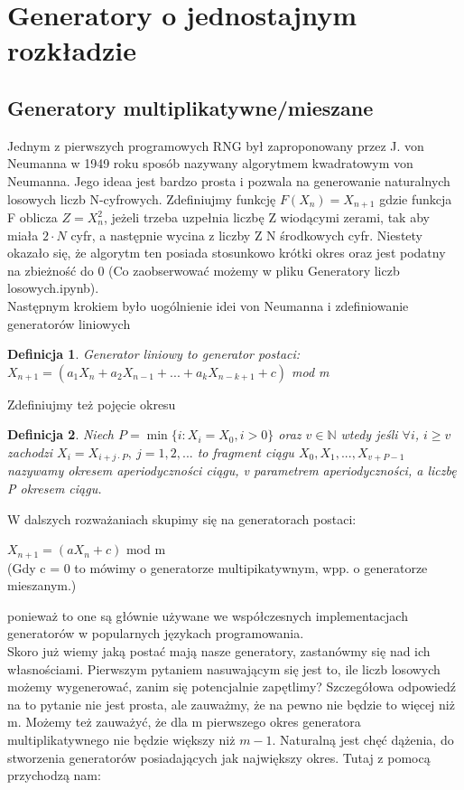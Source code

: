 \documentclass[a4paper]{scrartcl}
\newtheorem{definition}{Definicja}
\begin{document}
\section{Generatory o jednostajnym rozkładzie}
\subsection{Generatory multiplikatywne/mieszane}
\qquad Jednym z pierwszych programowych RNG był zaproponowany przez J. von Neumanna w 1949 roku sposób nazywany algorytmem kwadratowym von Neumanna. Jego ideaa jest bardzo prosta i pozwala na generowanie naturalnych losowych liczb N-cyfrowych. Zdefiniujmy funkcję $F(X_n) = X_{n+1}$ gdzie funkcja F oblicza $Z = X_n^2$, jeżeli trzeba uzpełnia liczbę Z wiodącymi zerami, tak aby miała $2 \cdot N$ cyfr, a następnie wycina z liczby Z N środkowych cyfr. Niestety okazało się, że algorytm ten posiada stosunkowo krótki okres oraz jest podatny na zbieżność do 0 (Co zaobserwować możemy w pliku Generatory liczb losowych.ipynb).\\
\null\qquad Następnym krokiem było uogólnienie idei von Neumanna i zdefiniowanie generatorów liniowych\\
\begin{definition}
Generator liniowy to generator postaci:\\
\center$X_{n+1} = (a_1X_n + a_2X_{n-1} + ... + a_kX_{n-k+1} + c)$ mod m
\end{definition}
Zdefiniujmy też pojęcie okresu
\begin{definition}
Niech $P = \min \{i: X_i = X_0, i > 0\}$ oraz $v \in \mathbb{N}$ wtedy jeśli 
$\forall i$, $i \geq v$ zachodzi $X_i=X_{i+j \cdot P}, \: j=1, 2,...$ to fragment ciągu $X_0, X_1,..., X_{v+P-1}$ nazywamy okresem aperiodyczności ciągu, v parametrem aperiodyczności, a liczbę P okresem ciągu.
\end{definition}
W dalszych rozważaniach skupimy się na generatorach postaci:\\
\begin{center}
$X_{n+1} = (aX_n + c)$ mod m\\
(Gdy c = 0 to mówimy o generatorze multipikatywnym, wpp. o generatorze mieszanym.)
\end{center}
ponieważ to one są głównie używane we współczesnych implementacjach generatorów w popularnych językach programowania.\\
Skoro już wiemy jaką postać mają nasze generatory, zastanówmy się nad ich własnościami. Pierwszym pytaniem nasuwającym się jest to, ile liczb losowych możemy wygenerować, zanim się potencjalnie zapętlimy? Szczegółowa odpowiedź na to pytanie nie jest prosta, ale zauważmy, że na pewno nie będzie to więcej niż m. Możemy też zauważyć, że dla m pierwszego okres generatora multiplikatywnego nie będzie większy niż $m-1$. Naturalną jest chęć dążenia, do stworzenia generatorów posiadających jak największy okres. Tutaj z pomocą przychodzą nam:
\end{document}
